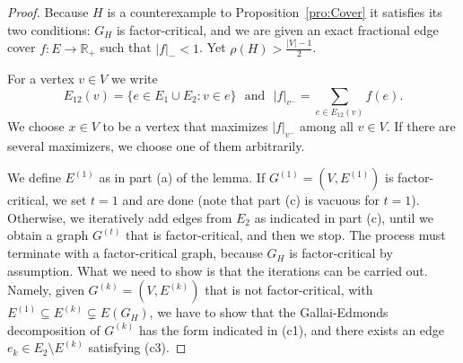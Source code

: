 \documentclass{article}
\theoremstyle{definition}
\begin{document}
\begin{proof} Because $H$ is a counterexample to Proposition~\ref{pro:Cover} it satisfies its two conditions: $G_H$ is factor-critical, and we are given an exact fractional edge cover $f: E \to \mathbb{R}_+$ such that $|f|_- < 1$. Yet $\rho(H) > \frac{|V|-1}{2}$.

For a vertex $v \in V$ we write \[ E_{12}(v) = \{ e \in E_1 \cup E_2: v \in e\}\,\, \textrm { and } \,\,|f|_{v^-} = \sum_{e \in E_{12}(v)} f(e).\] We choose $x \in V$ to be a vertex that maximizes $|f|_{v^-}$ among all $v \in V$. If there are several maximizers, we choose one of them arbitrarily.

We define $E^{(1)}$ as in part (a) of the lemma. If $G^{(1)} = (V, E^{(1)})$ is factor-critical, we set $t=1$ and are done (note that part (c) is vacuous for $t=1$). Otherwise, we iteratively add edges from $E_2$ as indicated in part (c), until we obtain a graph $G^{(t)}$ that is factor-critical, and then we stop. The process must terminate with a factor-critical graph, because $G_H$ is factor-critical by assumption. What we need to show is that the iterations can be carried out. Namely, given $G^{(k)} = (V, E^{(k)})$ that is not factor-critical, with $E^{(1)} \subseteq E^{(k)} \subsetneq E(G_H)$, we have to show that the Gallai-Edmonds decomposition of $G^{(k)}$ has the form indicated in (c1), and there exists an edge $e_k \in E_2 \setminus E^{(k)}$ satisfying (c3).


\end{proof}
\end{document}
